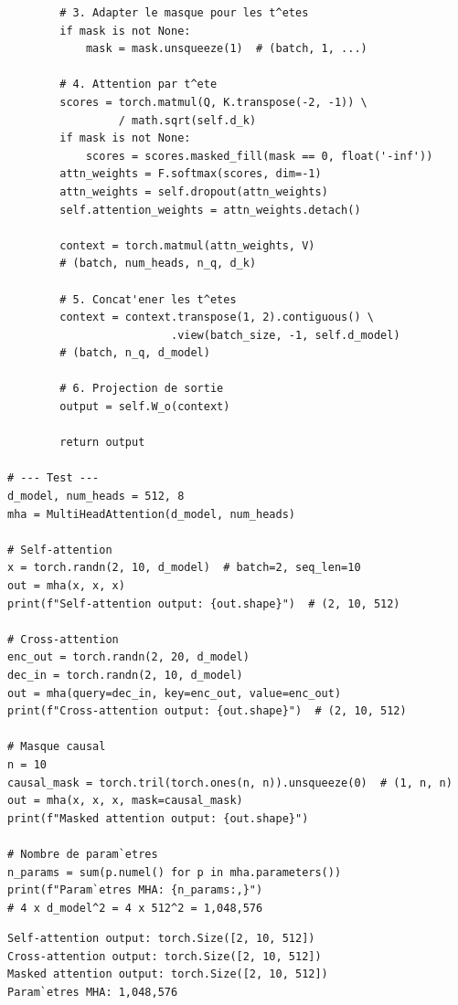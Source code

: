 \begin{codeblock}[title=\textbf{Multi-Head Attention compl\`ete}]
\begin{verbatim}
        # 3. Adapter le masque pour les t^etes
        if mask is not None:
            mask = mask.unsqueeze(1)  # (batch, 1, ...)

        # 4. Attention par t^ete
        scores = torch.matmul(Q, K.transpose(-2, -1)) \
                 / math.sqrt(self.d_k)
        if mask is not None:
            scores = scores.masked_fill(mask == 0, float('-inf'))
        attn_weights = F.softmax(scores, dim=-1)
        attn_weights = self.dropout(attn_weights)
        self.attention_weights = attn_weights.detach()

        context = torch.matmul(attn_weights, V)
        # (batch, num_heads, n_q, d_k)

        # 5. Concat'ener les t^etes
        context = context.transpose(1, 2).contiguous() \
                         .view(batch_size, -1, self.d_model)
        # (batch, n_q, d_model)

        # 6. Projection de sortie
        output = self.W_o(context)

        return output

# --- Test ---
d_model, num_heads = 512, 8
mha = MultiHeadAttention(d_model, num_heads)

# Self-attention
x = torch.randn(2, 10, d_model)  # batch=2, seq_len=10
out = mha(x, x, x)
print(f"Self-attention output: {out.shape}")  # (2, 10, 512)

# Cross-attention
enc_out = torch.randn(2, 20, d_model)
dec_in = torch.randn(2, 10, d_model)
out = mha(query=dec_in, key=enc_out, value=enc_out)
print(f"Cross-attention output: {out.shape}")  # (2, 10, 512)

# Masque causal
n = 10
causal_mask = torch.tril(torch.ones(n, n)).unsqueeze(0)  # (1, n, n)
out = mha(x, x, x, mask=causal_mask)
print(f"Masked attention output: {out.shape}")

# Nombre de param`etres
n_params = sum(p.numel() for p in mha.parameters())
print(f"Param`etres MHA: {n_params:,}")
# 4 x d_model^2 = 4 x 512^2 = 1,048,576
\end{verbatim}
\end{codeblock}

\begin{codeoutput}
\begin{verbatim}
Self-attention output: torch.Size([2, 10, 512])
Cross-attention output: torch.Size([2, 10, 512])
Masked attention output: torch.Size([2, 10, 512])
Param`etres MHA: 1,048,576
\end{verbatim}
\end{codeoutput}

